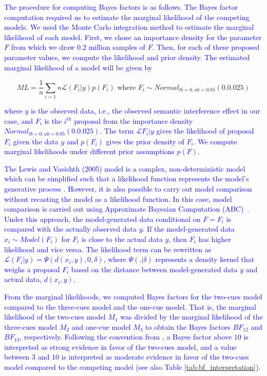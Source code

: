 \documentclass[a4paper, man, floatsintext]{apa7}
\begin{document}
{{\textcolor{blue}{The procedure for computing Bayes factors is as follows. The Bayes factor computation required us to estimate the marginal likelihood of the competing models. We used the Monte Carlo integration method to estimate the marginal likelihood of each model. First, we chose an importance density for the parameter $F$ from which we draw $0.2$ million samples of $F$. Then, for each of these proposed parameter values, we compute the likelihood and prior density. The estimated marginal likelihood of a model will be given by}

\begin{equation}
ML = \frac{1}{n} \sum_{i=1}{n} \mathcal{L}(F_i|y) p(F_i)  \text{ where } F_i \sim Normal_{lb=0,ub=0.05}(0.0.025) 
\end{equation}

\noindent \textcolor{blue}{where $y$ is the observed data, i.e., the observed semantic interference effect in our case, and $F_i$ is the $i^{th}$ proposal from the importance density $Normal_{lb=0,ub=0.05}(0.0.025) $. 
The term $\mathcal{L}{F_i|y}$ gives the likelihood of proposal $F_i$ given the data $y$ and $p(F_i)$ gives the prior density of $F_i$. We compute marginal likelihoods under different prior assumptions $p(F)$.}

\textcolor{blue}{The Lewis and Vasishth (2005) model is a complex, non-deterministic model which can be simplified such that a likelihood function represents the model's generative process  \parencite[e.g., in][]{NicenboimRetrieval2018,lisson2020computational}. However, it is also possible to carry out model comparison without recasting the model as a likelihood function. In this case, model comparison is carried out using Approximate Bayesian Computation (ABC)~\citep{sisson2018handbook,palestro2018likelihood}. Under this approach, the model-generated data conditional on $F=F_i$ is compared with the actually observed data $y$. If the model-generated data $x_{i} \sim Model(F_i)$ for $F_i$ is close to the actual data $y$, then $F_i$ has higher likelihood and vice versa. The likelihood term can be rewritten as $\mathcal{L}(F_i|y) = \Psi(d(x_i, y), 0 , \delta)$, where $\Psi(.|\delta)$ represents a density kernel that weighs a proposal $F_i$ based on the distance between model-generated data $y$ and actual data, $d(x_i,y)$.}

\textcolor{blue}{From the marginal likelihoods, we computed Bayes factors for the two-cues model compared to the three-cues model and the one-cue model. That is, the marginal likelihood of the two-cues model $M_1$ was divided by the marginal likelihood of the three-cues model $M_2$ and one-cue model $M_3$ to obtain the Bayes factors $BF_{12}$ and $BF_{13}$, respectively. Following the convention from \textcite{jeffreys1998theory}, a Bayes factor above $10$ is interpreted as strong evidence in favor of the two-cues model, and a value between $3$ and $10$ is interpreted as moderate evidence in favor of the two-cues model compared to the competing model (see also Table \ref{tab:bf_interpretation}).}

}}
\end{document}
